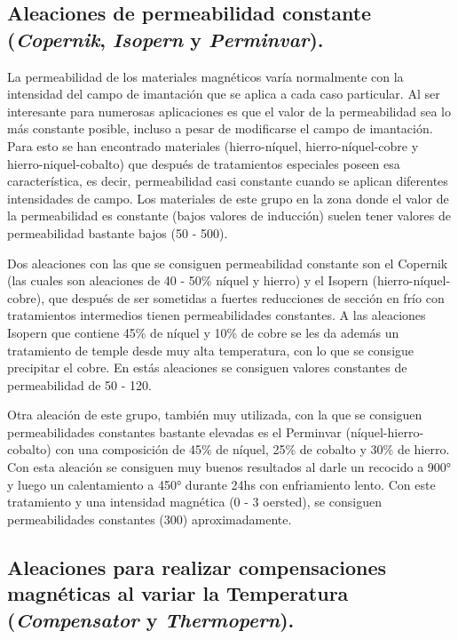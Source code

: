 \documentclass[12pt,a4paper]{article}
\begin{document}
\subsection{Aleaciones de permeabilidad constante (\textit{Copernik}, \textit{Isopern} y \textit{Perminvar}).}

La permeabilidad de los materiales magnéticos varía normalmente con la intensidad del campo de imantación que se aplica a cada caso particular. Al ser interesante para numerosas aplicaciones es que el valor de la permeabilidad sea lo más constante posible, incluso a pesar de modificarse el campo de imantación. Para esto se han encontrado materiales (hierro-níquel, hierro-níquel-cobre y hierro-niquel-cobalto) que después de tratamientos especiales poseen esa característica, es decir, permeabilidad casi constante cuando se aplican diferentes intensidades de campo. Los materiales de este grupo en la zona donde el valor de la permeabilidad es constante (bajos valores de inducción) suelen tener valores de permeabilidad bastante bajos (50 - 500).

Dos aleaciones con las que se consiguen permeabilidad constante son el Copernik (las cuales son aleaciones de 40 - 50\% níquel y hierro) y el Isopern (hierro-níquel-cobre), que después de ser sometidas a fuertes reducciones de sección en frío con tratamientos intermedios tienen permeabilidades constantes. A las aleaciones Isopern que contiene 45\% de níquel y 10\% de cobre se les da además un tratamiento de temple desde muy alta temperatura, con lo que se consigue precipitar el cobre. En estás aleaciones se consiguen valores constantes de permeabilidad de 50 - 120.

Otra aleación de este grupo, también muy utilizada, con la que se consiguen permeabilidades constantes bastante elevadas es el Perminvar (níquel-hierro-cobalto) con una composición de 45\% de níquel, 25\% de cobalto y 30\% de hierro. Con esta aleación se consiguen muy buenos resultados al darle un recocido a 900° y luego un calentamiento a 450° durante 24hs con enfriamiento lento. Con este tratamiento y una intensidad magnética (0 - 3 oersted), se consiguen permeabilidades constantes (300) aproximadamente.

\subsection{Aleaciones para realizar compensaciones magnéticas al variar la Temperatura (\textit{Compensator} y \textit{Thermopern}).}
\end{document}
